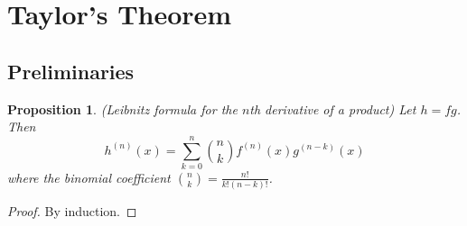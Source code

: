 \documentclass[12pt]{article}
\newtheorem{proposition}{Proposition}[theorem]
\theoremstyle{definition}
\theoremstyle{remark}
\begin{document}
\section{Taylor's Theorem}
\subsection{Preliminaries}
\begin{proposition}
   (Leibnitz formula for the $n$th derivative of a product) Let $h=fg$. Then
   $$h^{(n)}(x)=\sum_{k=0}^n\binom{n}{k}f^{(n)}(x)g^{(n-k)}(x)$$
   where the binomial coefficient $\binom{n}{k}=\frac{n!}{k!(n-k)!}$.
\end{proposition}
\begin{proof}
    By induction.
\end{proof}
\end{document}
